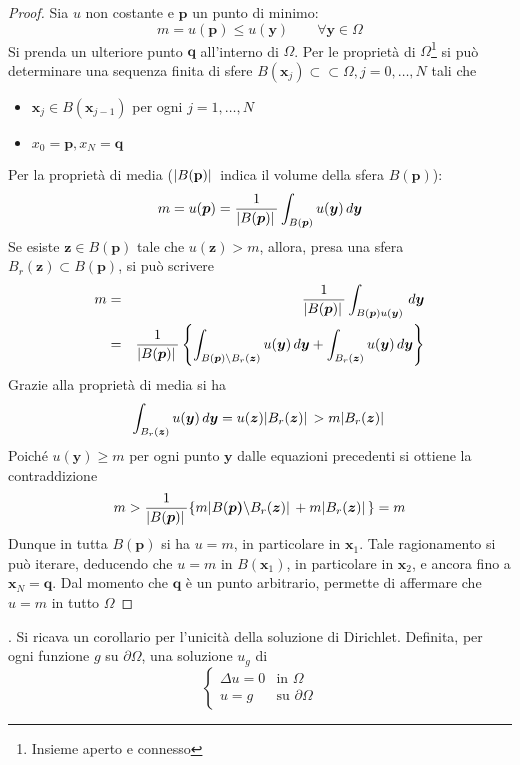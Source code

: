 \documentclass[a4paper,12pt, draft]{article}
\theoremstyle{break}
\numberwithin{equation}{section}
\begin{document}
\begin{proof}
  Sia \(u\) non costante e \(\bm{p}\) un punto di minimo:
  \[
    m = u(\bm{p}) \leq u(\bm{y}) \qquad \forall \bm{y} \in \Omega
  \]
  Si prenda un ulteriore punto \(\bm{q}\) all'interno di \(\Omega\). Per le proprietà di \(\Omega\)\footnote{Insieme aperto e connesso} si può determinare una sequenza finita di sfere \(B(\bm{x}_j) \subset \subset \Omega, j = 0, \ldots, N\) tali che 
  \begin{itemize}
    \item \(\bm{x}_j \in B(\bm{x}_{j-1})\) per ogni \(j = 1, \ldots, N\)
    \item \(x_0 = \mathbf{p}, x_N = \mathbf{q}\)
  \end{itemize}
  Per la proprietà di media (\(\abs*{B(\mathbf{p})}\) indica il volume della sfera \(B(\mathbf{p})\)):
  \[
    m = u(\bm{p}) = \frac{1}{\abs*{B(\bm{p})}} \int_{B(\bm{p})} u(\bm{y}) \, d\bm{y}
  \]
Se esiste \(\bm{z} \in B(\bm{p})\) tale che \(u(\bm{z}) > m\), allora, presa una sfera \(B_r(\bm{z}) \subset B(\bm{p})\), si può scrivere
\begin{eqnarray*}
  m & = & \frac{1}{\abs*{B(\bm{p})}} \int_{B(\bm{p})u(\bm{y})} \, d\bm{y} \\
  & = & \frac{1}{\abs*{B(\bm{p})}} \left\lbrace \int_{B(\bm{p})\backslash B_r(\bm{z})} u(\bm{y}) \, d\bm{y} + \int_{B_r(\bm{z})} u(\bm{y}) \, d\bm{y} \right\rbrace
\end{eqnarray*}
Grazie alla proprietà di media si ha
\begin{equation}
  \int_{B_r(\bm{z})} u(\bm{y}) \, d\bm{y} = u(\bm{z})\abs*{B_r(\bm{z})} > m\abs*{B_r(\bm{z})}
\end{equation}
Poiché \(u(\bm{y}) \geq m\) per ogni punto \(\bm{y}\) dalle equazioni precedenti si ottiene la contraddizione
\[
  m > \frac{1}{\abs*{B(\bm{p})}} \{m\abs*{B(\bm{p)}\backslash B_r(\bm{z})} + m\abs*{B_r(\bm{z})}\} = m
\]
Dunque in tutta \(B(\bm{p})\) si ha \(u = m\), in particolare in \(\bm{x}_1\). Tale ragionamento si può iterare, deducendo che \(u = m\) in \(B(\bm{x}_1)\), in particolare in \(\bm{x}_2\), e ancora fino a \(\bm{x}_N = \bm{q}\). Dal momento che \(\bm{q}\) è un punto arbitrario, permette di affermare che \(u = m\) in tutto \(\Omega\)
\end{proof}.
Si ricava un corollario per l'unicità della soluzione di Dirichlet. Definita, per ogni funzione \(g\) su \(\partial \Omega\), una soluzione \(u_g\) di 
\begin{equation}
  \begin{cases}
    \Delta u = 0 & \mbox{in }\Omega \\
    u = g & \mbox{su }\partial \Omega
  \end{cases}
\end{equation}
\end{document}

